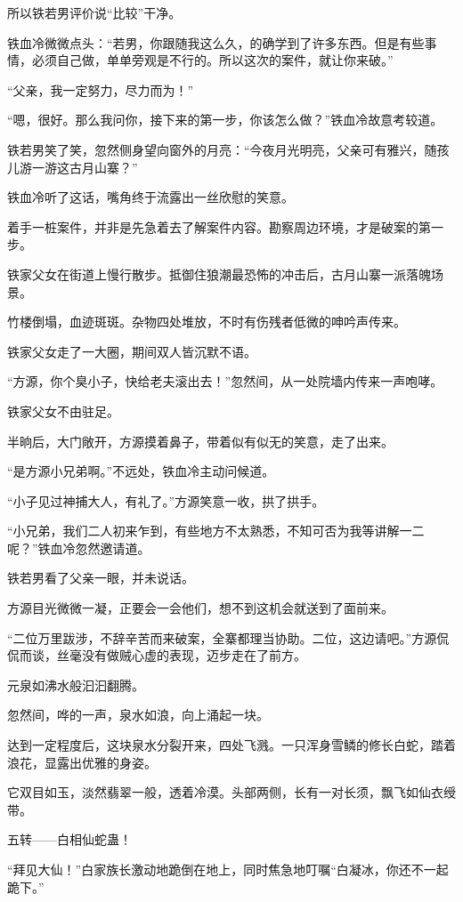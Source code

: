 \begin{this_body}
所以铁若男评价说“比较”干净。

铁血冷微微点头：“若男，你跟随我这么久，的确学到了许多东西。但是有些事情，必须自己做，单单旁观是不行的。所以这次的案件，就让你来破。”

“父亲，我一定努力，尽力而为！”

“嗯，很好。那么我问你，接下来的第一步，你该怎么做？”铁血冷故意考较道。

铁若男笑了笑，忽然侧身望向窗外的月亮：“今夜月光明亮，父亲可有雅兴，随孩儿游一游这古月山寨？”

铁血冷听了这话，嘴角终于流露出一丝欣慰的笑意。

着手一桩案件，并非是先急着去了解案件内容。勘察周边环境，才是破案的第一步。

铁家父女在街道上慢行散步。抵御住狼潮最恐怖的冲击后，古月山寨一派落魄场景。

竹楼倒塌，血迹斑斑。杂物四处堆放，不时有伤残者低微的呻吟声传来。

铁家父女走了一大圈，期间双人皆沉默不语。

“方源，你个臭小子，快给老夫滚出去！”忽然间，从一处院墙内传来一声咆哮。

铁家父女不由驻足。

半晌后，大门敞开，方源摸着鼻子，带着似有似无的笑意，走了出来。

“是方源小兄弟啊。”不远处，铁血冷主动问候道。

“小子见过神捕大人，有礼了。”方源笑意一收，拱了拱手。

“小兄弟，我们二人初来乍到，有些地方不太熟悉，不知可否为我等讲解一二呢？”铁血冷忽然邀请道。

铁若男看了父亲一眼，并未说话。

方源目光微微一凝，正要会一会他们，想不到这机会就送到了面前来。

“二位万里跋涉，不辞辛苦而来破案，全寨都理当协助。二位，这边请吧。”方源侃侃而谈，丝毫没有做贼心虚的表现，迈步走在了前方。

元泉如沸水般汩汩翻腾。

忽然间，哗的一声，泉水如浪，向上涌起一块。

达到一定程度后，这块泉水分裂开来，四处飞溅。一只浑身雪鳞的修长白蛇，踏着浪花，显露出优雅的身姿。

它双目如玉，淡然翡翠一般，透着冷漠。头部两侧，长有一对长须，飘飞如仙衣绶带。

五转——白相仙蛇蛊！

“拜见大仙！”白家族长激动地跪倒在地上，同时焦急地叮嘱“白凝冰，你还不一起跪下。”


\end{this_body}
